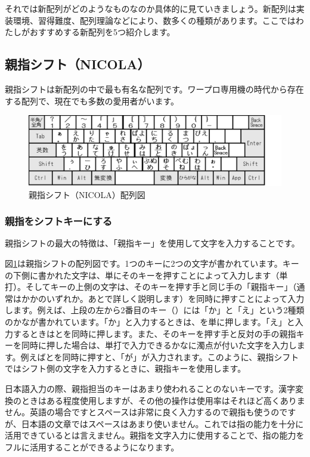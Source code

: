 それでは新配列がどのようなものなのか具体的に見ていきましょう。新配列は実装環境、習得難度、配列理論などにより、数多くの種類があります。ここではわたしがおすすめする新配列を5つ紹介します。

\subsection{親指シフト（NICOLA）}

親指シフトは新配列の中で最も有名な配列です。ワープロ専用機の時代から存在する配列で、現在でも多数の愛用者がいます。

\begin{figure}
 \begin{center}
   \includegraphics[width=14cm,clip]{res_kouy/NICOLA.eps}
 \end{center}
 \caption{親指シフト（NICOLA）配列図}
 \label{NICOLA}
\end{figure}

\subsubsection*{親指をシフトキーにする}

親指シフトの最大の特徴は、「親指キー」を使用して文字を入力することです。

図\ref{NICOLA}は親指シフトの配列図です。1つのキーに2つの文字が書かれています。キーの下側に書かれた文字は、単にそのキーを押すことによって入力します（単打）。そしてキーの上側の文字は、そのキーを押す手と同じ手の「親指キー」（通常はかかのいずれか。あとで詳しく説明します）を同時に押すことによって入力します。例えば、上段の左から2番目のキー（）には「か」と「え」という2種類のかなが書かれています。「か」と入力するときは、を単に押します。「え」と入力するときはとを同時に押します。また、そのキーを押す手と反対の手の親指キーを同時に押した場合は、単打で入力できるかなに濁点が付いた文字を入力します。例えばとを同時に押すと、「が」が入力されます。このように、親指シフトではシフト側の文字を入力するときに、親指キーを使用します。

日本語入力の際、親指担当のキーはあまり使われることのないキーです。漢字変換のときはある程度使用しますが、その他の操作は使用率はそれほど高くありません。英語の場合ですとスペースは非常に良く入力するので親指も使うのですが、日本語の文章ではスペースはあまり使いません。これでは指の能力を十分に活用できているとは言えません。親指を文字入力に使用することで、指の能力をフルに活用することができるようになります。

